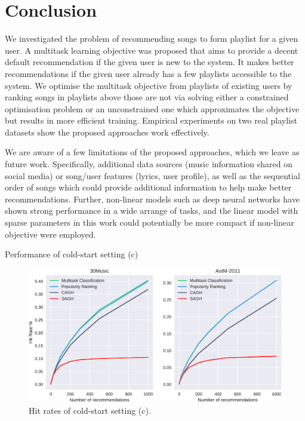 \section{Conclusion}
We investigated the problem of recommending songs to form playlist for a given user.
A multitask learning objective was proposed that aims to provide a decent default recommendation 
if the given user is new to the system.
It makes better recommendations if the given user already has a few playlists accessible to the system.
We optimise the multitask objective from playlists of existing users by ranking songs in playlists above those are not
via solving either a constrained optimisation problem or an unconstrained one which approximates the objective but 
results in more efficient training.
Empirical experiments on two real playlist datasets show the proposed approaches work effectively.





We are aware of a few limitations of the proposed approaches, which we leave as future work.
Specifically, additional data sources (\eg music information shared on social media) or song/user 
features (\eg lyrics, user profile), as well as the sequential order of songs which could provide 
additional information to help make better recommendations.
Further, non-linear models such as deep neural networks have shown strong performance in a wide arrange of tasks,
and the linear model with sparse parameters in this work could potentially be more compact if non-linear objective were employed.

\begin{table}[h]
\centering
\caption{Performance of cold-start setting (c)}
\label{tab:perf2}
\resizebox{\columnwidth}{!}{

}
\end{table}

\begin{figure}[h]
\centering
\includegraphics[width=\linewidth]{fig/hitrate2.pdf}
\caption{Hit rates of cold-start setting (c).}
\label{fig:hr2}
\end{figure}




